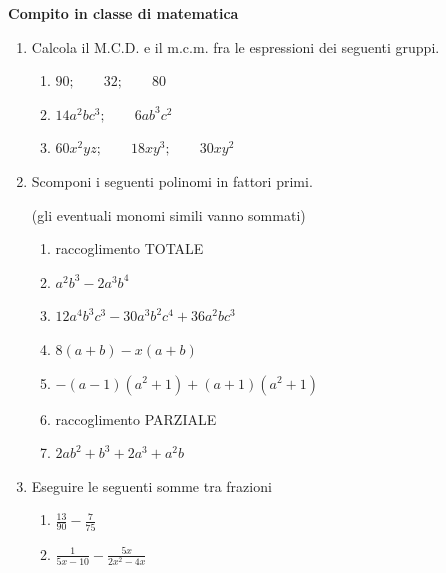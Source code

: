 \documentclass[14pt]{extarticle}
\begin{document}
\newpage

\begin{center}
{\bf Compito in classe di matematica}
\end{center}

\begin{enumerate}[label=\bfseries\arabic*)]
	\item Calcola il M.C.D. e il m.c.m. fra le espressioni dei seguenti gruppi.
		\begin{enumerate}
			\item
				$
					90;\qquad 32;\qquad 80
				$
			\item
				$
					14a^2bc^3;\qquad 6ab^3c^2			
				$				
			\item
				$
					60x^2yz; \qquad 18xy^3; \qquad 30 xy^2			
				$
		\end{enumerate}
	
	\item Scomponi i seguenti polinomi in fattori primi.
	
	\vspace{-10pt}

	{\tiny (gli eventuali monomi simili vanno sommati)}
	
		\begin{enumerate}
			
			\item[] raccoglimento TOTALE 
			\item
				$
					a^2b^3 -2a^3b^4
				$
			\item
				$
					12a^4b^3c^3 - 30a^3b^2c^4 + 36a^2bc^3 
				$
			\item
				$
					8\left( a + b \right) - x\left( a + b \right)
				$			
			\item
				$
					- \left( a - 1 \right)\left( a^2 + 1 \right) + \left( a + 1 \right)\left( a^2 + 1 \right)
				$


			\item[] raccoglimento PARZIALE 
			
			\item 
					$
						2ab^2 + b^3 + 2a^3 + a^2b
					$


		\end{enumerate}
	
		\item Eseguire le seguenti somme tra frazioni
			\begin{enumerate}
				\item
					$
						\frac{13}{90} - \frac{7}{75}
					$				
				\item
					$
						\frac{1}{5x - 10} - \frac{5x}{2x^2 - 4x}
					$
			\end{enumerate}
		

\end{enumerate}
\end{document}
